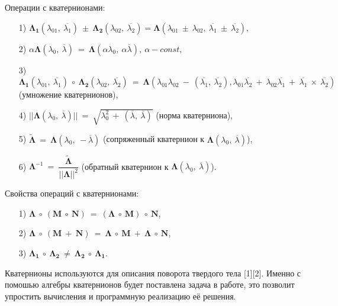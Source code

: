 \documentclass[14pt]{extreport}
\begin{document}
Операции с кватернионами:
\begin{itemize}
\item[1)] $\boldsymbol{\Lambda_1}(\lambda_{01},\ \overline{\lambda_1})\ \pm\ \boldsymbol{\Lambda_2}(\lambda_{02},\ \overline{\lambda_2}) =
\boldsymbol\Lambda(\lambda_{01}\ \pm\ \lambda_{02},\ \overline{\lambda_1}\ \pm\ \overline{\lambda_2}),$
\item[2)] $\alpha\boldsymbol\Lambda(\lambda_{0},\ \overline{\lambda})\ =\ \boldsymbol\Lambda(\alpha\lambda_{0},\ \alpha\overline{\lambda}),\ \alpha - const,$ 
\item[3)] $\boldsymbol{\Lambda_1}(\lambda_{01},\ \overline{\lambda_1})\ \circ\ \boldsymbol{\Lambda_2}(\lambda_{02},\ 
\overline{\lambda_2})\ =\ \boldsymbol\Lambda(\lambda_{01}\lambda_{02}\ -\ (\overline{\lambda_1},\ \overline{\lambda_2}),
\lambda_{01}\overline{\lambda_2}\ +\ \lambda_{02}\overline{\lambda_{1}}\ +\ \overline{\lambda_{1}}\ \times\ \overline{\lambda_{2}})$
(умножение кватернионов),
\item[4)] $||\boldsymbol\Lambda(\lambda_{0},\ \overline{\lambda})||\ =\ \sqrt{\lambda_{0}^2\ +\ (\overline{\lambda},\ \overline{\lambda})}$ (норма кватерниона),
\item[5)] $\widetilde{\boldsymbol\Lambda}\ =\ \boldsymbol\Lambda(\lambda_{0},\ -\overline{\lambda})$ (сопряженный кватернион к $\boldsymbol\Lambda(\lambda_{0},\ \overline{\lambda})$),
\item[6)] $\boldsymbol\Lambda^{-1}\ =\ \dfrac{\widetilde{\boldsymbol\Lambda}}{||\boldsymbol\Lambda||^2} $ (обратный кватернион к $\boldsymbol\Lambda(\lambda_{0},\ \overline{\lambda})$).
\end{itemize}

Свойства операций с кватернионами:

\begin{itemize}
\item[1)] $\boldsymbol\Lambda\ \circ\ (\boldsymbol{M}\ \circ\ \boldsymbol{N})\ =\ (\boldsymbol\Lambda\ \circ\ \boldsymbol{M})\ \circ\ \boldsymbol{N}$,
\item[2)] $\boldsymbol\Lambda\ \circ\ (\boldsymbol{M}\ +\ \boldsymbol{N})\ =\ \boldsymbol\Lambda\ \circ\ \boldsymbol{M}\ +\ \boldsymbol\Lambda\ \circ\ \boldsymbol{N}$,
\item[3)] $\boldsymbol{\Lambda_1}\ \circ\ \boldsymbol{\Lambda_2}\ \neq\ \boldsymbol{\Lambda_2}\ \circ\ \boldsymbol{\Lambda_1}$.
\end{itemize}

Кватернионы используются для описания поворота твердого тела [1][2]. Именно с помошью алгебры кватернионов
будет поставлена задача в работе, это позволит упростить вычисления и программную реализацию её решения. 
\end{document}
